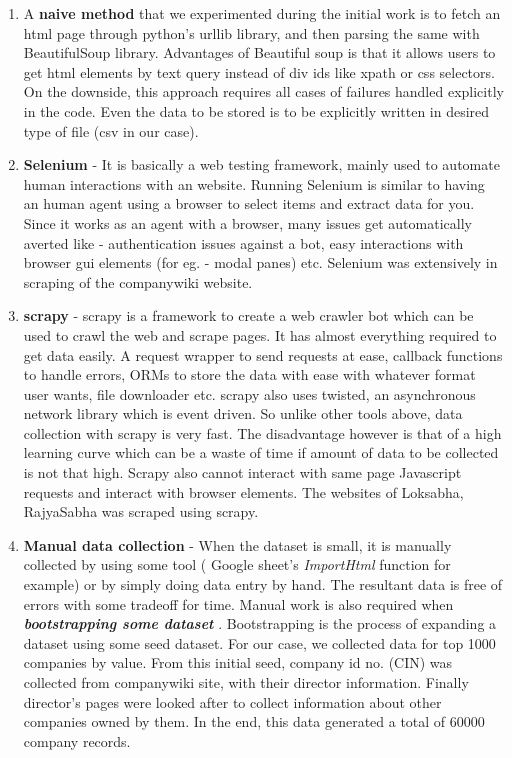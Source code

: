 \begin{enumerate}

    \item A \textbf{ naive method } that we experimented during the initial work is to fetch an html page through python's urllib library, and then parsing the same with BeautifulSoup library. Advantages of Beautiful soup is that it allows users to get html elements by text query instead of div ids like xpath or css selectors. On the downside, this approach requires all cases of failures handled explicitly in the code. Even the data to be stored is to be explicitly written in desired type of file (csv in our case).

    \item \textbf{ Selenium } - It is basically a web testing framework, mainly used to automate human interactions with an website. Running Selenium is similar to having an human agent using a browser to select items and extract data for you. Since it works as an agent with a browser, many issues get automatically averted like - authentication issues against a bot, easy interactions with browser gui elements (for eg. - modal panes) etc. Selenium was extensively in scraping of the companywiki website.

    \item \textbf{ scrapy } - scrapy is a framework to create a web crawler bot which can be used to crawl the web and scrape pages. It has almost everything required to get data easily. A request wrapper to send requests at ease, callback functions to handle errors, ORMs to store the data with ease with whatever format user wants, file downloader etc. scrapy also uses twisted, an asynchronous network library which is event driven. So unlike other tools above, data collection with scrapy is very fast. The disadvantage however is that of a high learning curve which can be a waste of time if amount of data to be collected is not that high. Scrapy also cannot interact with same page Javascript requests and interact with browser elements. The websites of Loksabha, RajyaSabha was scraped using scrapy.

    \item \textbf{ Manual data collection } - When the dataset is small, it is manually collected by using some tool ( Google sheet's \emph{ ImportHtml } function for example) or by simply doing data entry by hand. The resultant data is free of errors with some tradeoff for time. Manual work is also required when \textbf {\emph { bootstrapping some dataset } }. Bootstrapping is the process of expanding a dataset using some seed dataset. For our case, we collected data for top 1000 companies by value. From this initial seed, company id no. (CIN) was collected from companywiki site, with their director information. Finally director's pages were looked after to collect information about other companies owned by them. In the end, this data generated a total of 60000 company records.


\end{enumerate}
